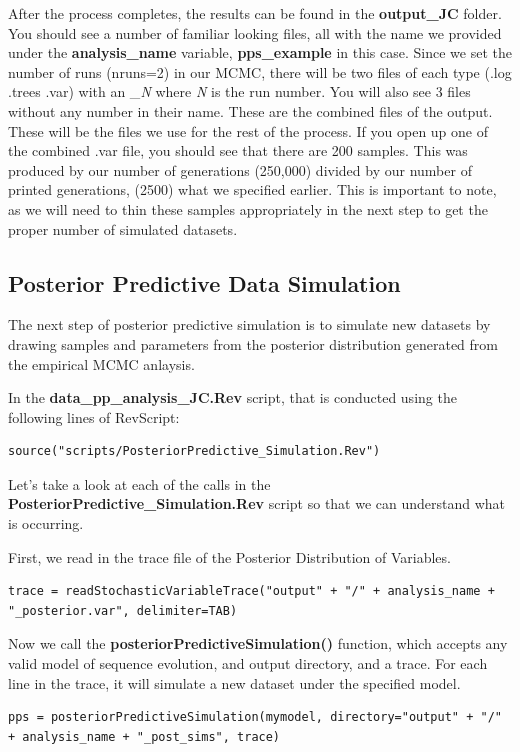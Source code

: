 After the process completes, the results can be found in the \textbf{output\_JC} folder. You should see a 
number of familiar looking files, all with the name we provided under the \textbf{analysis\_name} variable, 
\textbf{pps\_example} in this case. Since we set the number of runs (nruns=2) in our MCMC, there will be two files 
of each type (.log .trees .var) with an \_\textit{N} where \textit{N} is the run number. You will also see 3 files without 
any number in their name. These are the combined files of the output. These will be the files we use for 
the rest of the process. If you open up one of the combined .var file, you should see that there are 200 
samples. This was produced by our number of generations (250,000) divided by our number of printed generations,
(2500) what we specified earlier. This is important to note, as we will need to thin these samples 
appropriately in the next step to get the proper number of simulated datasets. 


\subsection{Posterior Predictive Data Simulation}
The next step of posterior predictive simulation is to simulate new datasets by drawing samples and 
parameters from the posterior distribution generated from the empirical MCMC anlaysis. 

In the \textbf{data\_pp\_analysis\_JC.Rev} script, that is conducted using the following lines of RevScript: 
{\tt \begin{Snugshade}[184,207,236]
\begin{lstlisting}
source("scripts/PosteriorPredictive_Simulation.Rev")
\end{lstlisting}
\end{Snugshade}}

Let's take a look at each of the calls in the \textbf{PosteriorPredictive\_Simulation.Rev} script so 
that we can understand what is occurring. 

First, we read in the trace file of the Posterior Distribution of Variables.
{\tt \begin{Snugshade}[184,207,236]
\begin{lstlisting}
trace = readStochasticVariableTrace("output" + "/" + analysis_name + "_posterior.var", delimiter=TAB)
\end{lstlisting}
\end{Snugshade}}

Now we call the \textbf{posteriorPredictiveSimulation()} function, which accepts any valid model of sequence evolution, and output directory, and a trace. For each line in the trace, it will simulate a new dataset under the specified model.
{\tt \begin{Snugshade}[184,207,236]
\begin{lstlisting}
pps = posteriorPredictiveSimulation(mymodel, directory="output" + "/" + analysis_name + "_post_sims", trace)
\end{lstlisting}
\end{Snugshade}}

